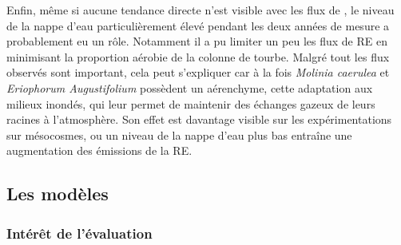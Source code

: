Enfin, même si aucune tendance directe n'est visible avec les flux de \coo, le niveau de la nappe d'eau particulièrement élevé pendant les deux années de mesure a probablement eu un rôle.
Notamment il a pu limiter un peu les flux de RE en minimisant la proportion aérobie de la colonne de tourbe.
Malgré tout les flux observés sont important, cela peut s'expliquer car à la fois \textit{Molinia caerulea} et \textit{Eriophorum Augustifolium} possèdent un aérenchyme, cette adaptation aux milieux inondés, qui leur permet de maintenir des échanges gazeux de leurs racines à l'atmosphère.
Son effet est davantage visible sur les expérimentations sur mésocosmes, ou un niveau de la nappe d'eau plus bas entraîne une augmentation des émissions de la RE.



\subsection*{Les modèles}

\subsubsection{Intérêt de l'évaluation}


